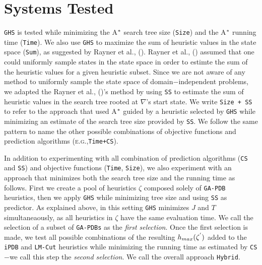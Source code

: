 \section{Systems Tested}
\noindent
\texttt{GHS} is tested while minimizing the A$\sp{*}$ search tree size (\texttt{Size}) and the A$\sp{*}$ running time (\texttt{Time}). We also use \texttt{GHS} to maximize the sum of heuristic values in the state space (\texttt{Sum}), as suggested by Rayner et al., (\citeyear{raynersss13}). Rayner et al., (\citeyear{raynersss13}) assumed that one could uniformly sample states in the state space in order to estimte the sum of the heuristic values for a given heuristic subset. Since we are not aware of any method to uniformly sample the state space of domain$-$independent problems, we adapted the Rayner et al., (\citeyear{raynersss13})'s method by using \texttt{SS} to estimate the sum of heuristic values in the search tree rooted at $\nabla$'s start state. We write \texttt{Size + SS} to refer to the approach that used A$\sp{*}$ guided by a heuristic selected by \texttt{GHS} while minimizing an estimate of the search tree size provided by \texttt{SS}. We follow the same pattern to name the other possible combinations of objective functions and prediction algorithms (\textsc{e.g.,}\texttt{Time+CS}).

In addition to experimenting with all combination of prediction algorithms (\texttt{CS} and \texttt{SS}) and objective functions (\texttt{Time}, \texttt{Size}), we also experiment with an approach that minimizes both the search tree size and the running time as follows. First we create a pool of heuristics $\zeta$ composed solely of \texttt{GA-PDB} heuristics, then we apply \texttt{GHS} while minimizing tree size and using \texttt{SS} as predictor. As explained above, in this setting \texttt{GHS} minimizes $J$ and $T$ simultaneaously, as all heuristics in $\zeta$ have the same evaluation time. We call the selection of a subset of \texttt{GA-PDBs} as the \textit{first selection}. Once the first selection is made, we test all possible combinations of the resulting $h_{max}(\zeta\sp{'})$ added to the \texttt{iPDB} and \texttt{LM-Cut} heuristics while minimizing the running time as estimated by \texttt{CS}$-$we call this step the \textit{second selection}. We call the overall approach \texttt{Hybrid}.

